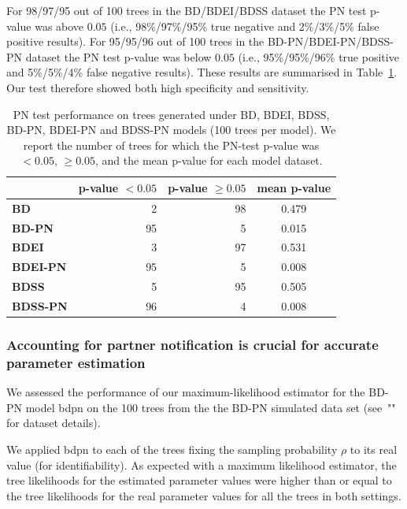 \documentclass[10pt,letterpaper]{article}
\begin{document}
For 98/97/95 out of 100 trees in the BD/BDEI/BDSS dataset the PN test p-value was above $0.05$ (i.e., 98\%/97\%/95\% true negative and 2\%/3\%/5\% false positive results). For 95/95/96 out of 100 trees in the BD-PN/BDEI-PN/BDSS-PN dataset the PN test p-value was below $0.05$ (i.e., 95\%/95\%/96\% true positive and 5\%/5\%/4\% false negative results). These results are summarised in Table~\ref{tbl:pntest}. Our test therefore showed both high specificity and sensitivity.

\begin{table}[!h]\centering
\small
\caption{PN test performance on trees generated under BD, BDEI, BDSS, BD-PN, BDEI-PN and BDSS-PN models (100 trees per model). We report the number of trees for which the PN-test p-value was $<0.05$, $\geq 0.05$, and the mean p-value for each model dataset.}
\begin{tabular}{l|r|r|c}
 & \textbf{p-value $<0.05$} & \textbf{p-value $\geq0.05$} & \textbf{mean p-value} \\
  \midrule
\textbf{BD}& 2 & 98 & 0.479 \\
\textbf{BD-PN}& 95 & 5 & 0.015 \\
  \midrule
\textbf{BDEI}& 3 & 97 & 0.531 \\
\textbf{BDEI-PN}& 95 & 5 & 0.008 \\
  \midrule
\textbf{BDSS}& 5 & 95 & 0.505 \\
\textbf{BDSS-PN}& 96 & 4 & 0.008 \\
\end{tabular}
\label{tbl:pntest}
\end{table}

\subsubsection*{Accounting for partner notification is crucial for accurate parameter estimation}

We assessed the performance of our maximum-likelihood estimator for the BD-PN model bdpn on the 100 trees from the the BD-PN simulated data set (see~"" for dataset details).

We applied bdpn to each of the trees fixing the sampling probability $\rho$ to its real value (for identifiability). %
As expected with a maximum likelihood estimator, the tree likelihoods for the estimated parameter values were higher than or equal to the tree likelihoods for the real parameter values for all the trees in both settings.
\end{document}
